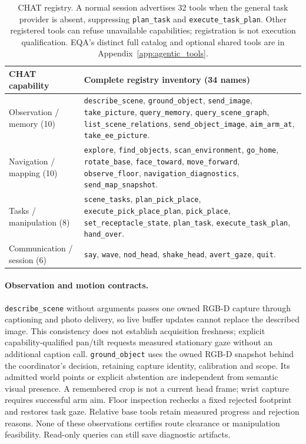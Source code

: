 \begin{table}[htbp]
\centering
\small
\begin{tabular}{@{}p{.20\linewidth}p{.75\linewidth}@{}}
\toprule
CHAT capability & Complete registry inventory (34 names) \\
\midrule
Observation / memory (10) & \texttt{describe\_scene}, \texttt{ground\_object},
\texttt{send\_image}, \texttt{take\_picture}, \texttt{query\_memory},
\texttt{query\_scene\_graph}, \texttt{list\_scene\_relations},
\texttt{send\_object\_image}, \texttt{aim\_arm\_at}, \texttt{take\_ee\_picture}. \\
Navigation / mapping (10) & \texttt{explore}, \texttt{find\_objects},
\texttt{scan\_environment}, \texttt{go\_home}, \texttt{rotate\_base},
\texttt{face\_toward}, \texttt{move\_forward}, \texttt{observe\_floor},
\texttt{navigation\_diagnostics}, \texttt{send\_map\_snapshot}. \\
Tasks / manipulation (8) & \texttt{scene\_tasks}, \texttt{plan\_pick\_place},
\texttt{execute\_pick\_place\_plan}, \texttt{pick\_place},
\texttt{set\_receptacle\_state}, \texttt{plan\_task},
\texttt{execute\_task\_plan}, \texttt{hand\_over}. \\
Communication / session (6) & \texttt{say}, \texttt{wave}, \texttt{nod\_head},
\texttt{shake\_head}, \texttt{avert\_gaze}, \texttt{quit}. \\
\bottomrule
\end{tabular}
\caption{CHAT registry. A normal session advertises 32 tools when the general
task provider is absent, suppressing \texttt{plan\_task} and
\texttt{execute\_task\_plan}. Other registered tools can refuse unavailable
capabilities; registration is not execution qualification. EQA's distinct full
catalog and optional shared tools are in Appendix~\ref{app:agentic_tools}.}
\label{tab:chat_capabilities}
\end{table}

\paragraph{Observation and motion contracts.}
\texttt{describe\_scene} without arguments passes one owned RGB-D capture
through captioning and photo delivery, so live buffer updates cannot replace the
described image. This consistency does not establish acquisition freshness;
explicit capability-qualified pan/tilt requests measured stationary gaze without
an additional caption call. \texttt{ground\_object} uses the owned RGB-D snapshot
behind the coordinator's decision, retaining capture identity, calibration and
scope. Its admitted world points or explicit abstention are independent from
semantic visual presence. A remembered crop is not a current head frame; wrist
capture requires successful arm aim. Floor inspection rechecks a fixed rejected
footprint and restores task gaze. Relative base tools retain measured progress
and rejection reasons. None of these observations certifies route clearance or
manipulation feasibility. Read-only queries can still save diagnostic artifacts.

